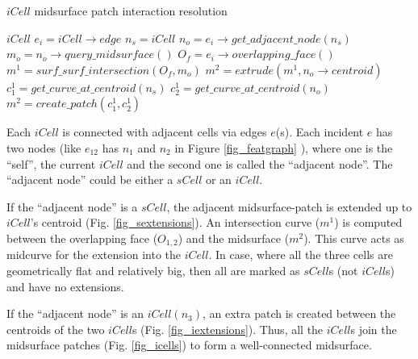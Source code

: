 
\bigskip
	
	\begin{algorithm}[!h]
		\caption{$iCell$ midsurface patch interaction resolution}
		\label{alg_MidsurfiCell}
		\begin{algorithmic}
			\REQUIRE $iCell$
				\STATE $e_i = iCell \rightarrow edge$
				\STATE $n_s = iCell $	
				\STATE $n_o = e_i \rightarrow get\_adjacent\_node(n_s) $			
					\STATE $m_o = n_o \rightarrow query\_midsurface()$
					\STATE $O_f = e_i \rightarrow overlapping\_face()$
					\STATE $m^1 = surf\_surf\_intersection(O_f, m_o)$
					\STATE $m^2 = extrude(m^1, n_o \rightarrow centroid)$
					\STATE $c^1_1= get\_curve\_at\_centroid(n_s)$
					\STATE $c^1_2 = get\_curve\_at\_centroid(n_o)$
					\STATE $m^2 = create\_patch(c^1_1, c^1_2)$
					\ENDIF
			\ENDWHILE
		\end{algorithmic}
	\end{algorithm}

\bigskip
Each $iCell$ is connected with adjacent cells via edges $e$(s).  Each incident $e$ has two nodes (like $e_{12}$ has $n_1$ and $n_2$  in Figure \ref{fig_featgraph} ), where one is the ``self'', the current $iCell$ and the second one is called the ``adjacent node''.  The ``adjacent node'' could be either a $sCell$ or an $iCell$.  

If the ``adjacent node'' is a $sCell$, the adjacent midsurface-patch is extended up to $iCell$'s centroid (Fig. \ref{fig_sextensions}). An intersection curve ($m^1$) is computed between the overlapping face ($O_{1,2}$) and the midsurface ($m^2$). This curve acts as midcurve for the extension into the $iCell$. In case, where all the three cells are geometrically flat and relatively big, then all are marked as  $sCell$s (not $iCell$s) and have no extensions. 

If the ``adjacent node'' is an $iCell(n_3)$, an extra patch is created between the centroids of the two $iCell$s (Fig. \ref{fig_iextensions}). Thus, all the $iCell$s join the midsurface patches (Fig. \ref{fig_icells}) to form a well-connected midsurface.

